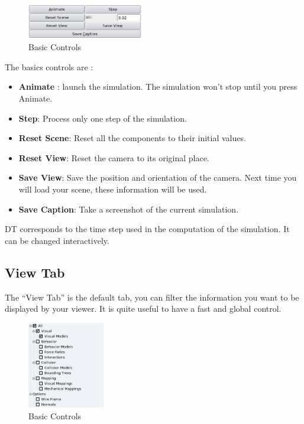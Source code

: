 \par

\begin{figure}
	\centering
		\includegraphics[width=0.45\textwidth]{GUI/GUI_basic.png}
	\caption{Basic Controls}
\end{figure}\begin{center}

\vspace{25mm}            \end{center}
The basics controls are :
\begin{itemize}
 \item {\bf Animate} : launch the simulation. The simulation won't stop until you press Animate.
 \item {\bf Step}: Process only one step of the simulation. 
 \item {\bf Reset Scene}: Reset all the components to their initial values.
 \item {\bf Reset View}: Reset the camera to its original place.
 \item {\bf Save View}: Save the position and orientation of the camera. Next time you will load your scene, these information will be used.
 \item {\bf Save Caption}: Take a screenshot of the current simulation.
\end{itemize}

DT corresponds to the time step used in the computation of the simulation. It can be changed interactively.










\subsection{View Tab}
The ``View Tab'' is the default tab, you can filter the information you want to be displayed by your viewer. It is quite useful to have a fast and global control. 

\begin{figure}[htpb]
	\centering
		\includegraphics[width=0.3\textwidth]{GUI/GUI_visual.png}
	\caption{Basic Controls}
\end{figure}


